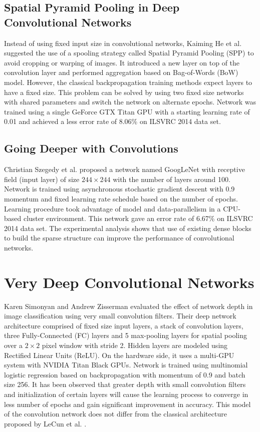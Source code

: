 \documentclass{llncs}
\begin{document}

\subsection{Spatial Pyramid Pooling in Deep Convolutional Networks}
Instead of using fixed input size in convolutional networks, Kaiming He et al. \cite{He2014} suggested  the use of a spooling strategy called  Spatial Pyramid Pooling (SPP) \cite{Grauman2005} \cite{1641019} to avoid cropping or warping of images. It introduced a new layer on top of the convolution layer and performed aggregation  based on Bag-of-Words (BoW) model. However, the classical backpropagation training methods expect layers to have a fixed   size.  This problem can be solved by using two fixed size networks with shared parameters and switch the network on alternate epochs. Network was trained using a single GeForce GTX Titan GPU with a starting  learning rate of 0.01 and achieved  a less  error rate of 8.06\% on  ILSVRC 2014 data set. 

%




\subsection{Going Deeper with Convolutions }
Christian Szegedy et al. \cite{Szegedy} proposed a network named GoogLeNet with receptive field (input layer) of size $244\times244$ with the number of layers around 100. Network is trained using asynchronous stochastic gradient descent with 0.9 momentum and fixed learning rate schedule based on the number of epochs. Learning procedure took advantage of  model and data-parallelism in a CPU-based cluster environment. This network gave an error rate of  6.67\%  on  ILSVRC 2014 data set. The experimental analysis shows that use of existing dense  blocks to  build the sparse structure can improve the  performance of convolutional networks. 

\section{Very Deep Convolutional Networks}
Karen Simonyan and Andrew Zisserman \cite{Arge2015} evaluated the effect of network depth in image classification using very small convolution filters. Their deep network architecture comprised of fixed  size input layers, a stack of convolution layers, three Fully-Connected (FC) layers and  5 max-pooling layers for spatial pooling  over a $2 \times 2$ pixel window with stride 2. Hidden layers are modeled using Rectified Linear Units (ReLU). On the hardware side, it uses a multi-GPU system with NVIDIA Titan Black GPUs. Network is trained using multinomial logistic regression  based on backpropagation with momentum of 0.9 and  batch size  256.
It has been observed that greater depth with small convolution filters and  initialization of certain layers will cause the learning process to converge in less number of epochs and gain significant improvement in accuracy. This model of the convolution network does not differ from the classical architecture proposed by LeCun et al. \cite{LeCun1998}. 
\end{document}
